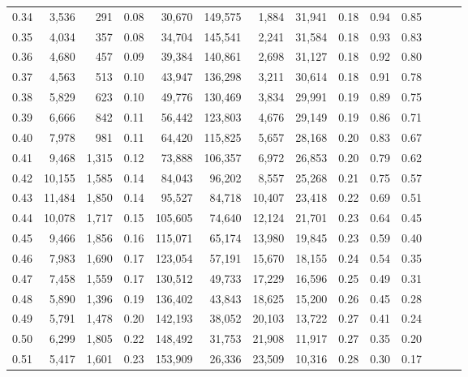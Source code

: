 \begin{tabular}{rrrrrrrrrrrrrr}
0.34 &   3,536 &    291 &  0.08 &   30,670 &  149,575 &   1,884 &  31,941 &  0.18 &  0.94 &      0.85 \\
0.35 &   4,034 &    357 &  0.08 &   34,704 &  145,541 &   2,241 &  31,584 &  0.18 &  0.93 &      0.83 \\
0.36 &   4,680 &    457 &  0.09 &   39,384 &  140,861 &   2,698 &  31,127 &  0.18 &  0.92 &      0.80 \\
0.37 &   4,563 &    513 &  0.10 &   43,947 &  136,298 &   3,211 &  30,614 &  0.18 &  0.91 &      0.78 \\
0.38 &   5,829 &    623 &  0.10 &   49,776 &  130,469 &   3,834 &  29,991 &  0.19 &  0.89 &      0.75 \\
0.39 &   6,666 &    842 &  0.11 &   56,442 &  123,803 &   4,676 &  29,149 &  0.19 &  0.86 &      0.71 \\
0.40 &   7,978 &    981 &  0.11 &   64,420 &  115,825 &   5,657 &  28,168 &  0.20 &  0.83 &      0.67 \\
0.41 &   9,468 &  1,315 &  0.12 &   73,888 &  106,357 &   6,972 &  26,853 &  0.20 &  0.79 &      0.62 \\
0.42 &  10,155 &  1,585 &  0.14 &   84,043 &   96,202 &   8,557 &  25,268 &  0.21 &  0.75 &      0.57 \\
0.43 &  11,484 &  1,850 &  0.14 &   95,527 &   84,718 &  10,407 &  23,418 &  0.22 &  0.69 &      0.51 \\
0.44 &  10,078 &  1,717 &  0.15 &  105,605 &   74,640 &  12,124 &  21,701 &  0.23 &  0.64 &      0.45 \\
0.45 &   9,466 &  1,856 &  0.16 &  115,071 &   65,174 &  13,980 &  19,845 &  0.23 &  0.59 &      0.40 \\
0.46 &   7,983 &  1,690 &  0.17 &  123,054 &   57,191 &  15,670 &  18,155 &  0.24 &  0.54 &      0.35 \\
0.47 &   7,458 &  1,559 &  0.17 &  130,512 &   49,733 &  17,229 &  16,596 &  0.25 &  0.49 &      0.31 \\
0.48 &   5,890 &  1,396 &  0.19 &  136,402 &   43,843 &  18,625 &  15,200 &  0.26 &  0.45 &      0.28 \\
0.49 &   5,791 &  1,478 &  0.20 &  142,193 &   38,052 &  20,103 &  13,722 &  0.27 &  0.41 &      0.24 \\
0.50 &   6,299 &  1,805 &  0.22 &  148,492 &   31,753 &  21,908 &  11,917 &  0.27 &  0.35 &      0.20 \\
0.51 &   5,417 &  1,601 &  0.23 &  153,909 &   26,336 &  23,509 &  10,316 &  0.28 &  0.30 &      0.17 \\

\end{tabular}
